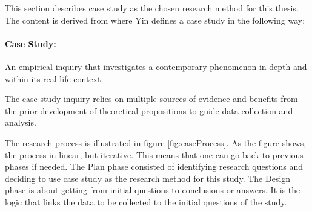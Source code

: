 This section describes case study as the chosen research method for this thesis. The content is derived from \cite{CaseStudyResearch} where Yin defines a case study in the following way:

\paragraph{Case Study:} An empirical inquiry that investigates a contemporary phenomenon in depth and within its real-life context.


The case study inquiry relies on multiple sources of evidence and benefits from the prior development of theoretical propositions to guide data collection and analysis.

The research process is illustrated in figure \ref{fig:caseProcess}. As the figure shows, the process in linear, but iterative. This means that one can go back to previous phases if needed. The Plan phase consisted of identifying research questions and deciding to use case study as the research method for this study. The Design phase is about getting from initial questions to conclusions or answers. It is the logic that links the data to be collected to the initial questions of the study. 

